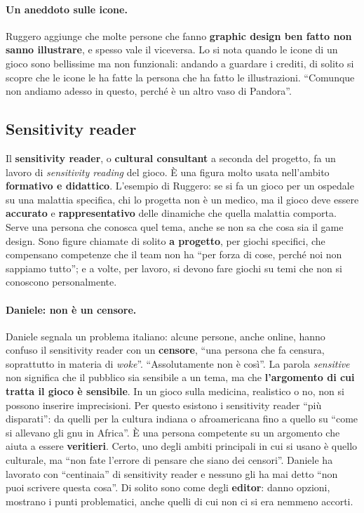\paragraph{Un aneddoto sulle icone.} Ruggero aggiunge che molte persone che
fanno \textbf{graphic design ben fatto non sanno illustrare}, e spesso vale il
viceversa. Lo si nota quando le icone di un gioco sono bellissime ma non
funzionali: andando a guardare i crediti, di solito si scopre che le icone le ha
fatte la persona che ha fatto le illustrazioni. ``Comunque non andiamo adesso in
questo, perché è un altro vaso di Pandora''.

\subsection{Sensitivity reader}

Il \textbf{sensitivity reader}, o \textbf{cultural consultant} a seconda del
progetto, fa un lavoro di \emph{sensitivity reading} del gioco. È una figura
molto usata nell'ambito \textbf{formativo e didattico}. L'esempio di Ruggero: se
si fa un gioco per un ospedale su una malattia specifica, chi lo progetta non è
un medico, ma il gioco deve essere \textbf{accurato} e \textbf{rappresentativo}
delle dinamiche che quella malattia comporta. Serve una persona che conosca quel
tema, anche se non sa che cosa sia il game design. Sono figure chiamate di
solito \textbf{a progetto}, per giochi specifici, che compensano competenze che
il team non ha ``per forza di cose, perché noi non sappiamo tutto''; e a volte,
per lavoro, si devono fare giochi su temi che non si conoscono personalmente.

\paragraph{Daniele: non è un censore.} Daniele segnala un problema italiano:
alcune persone, anche online, hanno confuso il sensitivity reader con un
\textbf{censore}, ``una persona che fa censura, soprattutto in materia di
\emph{woke}''. ``Assolutamente non è così''. La parola \emph{sensitive} non
significa che il pubblico sia sensibile a un tema, ma che \textbf{l'argomento di
cui tratta il gioco è sensibile}. In un gioco sulla medicina, realistico o no,
non si possono inserire imprecisioni. Per questo esistono i sensitivity reader
``più disparati'': da quelli per la cultura indiana o afroamericana fino a quello
su ``come si allevano gli gnu in Africa''. È una persona competente su un
argomento che aiuta a essere \textbf{veritieri}. Certo, uno degli ambiti
principali in cui si usano è quello culturale, ma ``non fate l'errore di pensare
che siano dei censori''. Daniele ha lavorato con ``centinaia'' di sensitivity
reader e nessuno gli ha mai detto ``non puoi scrivere questa cosa''. Di solito
sono come degli \textbf{editor}: danno opzioni, mostrano i punti problematici,
anche quelli di cui non ci si era nemmeno accorti.

